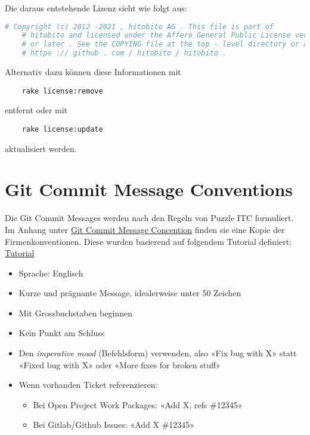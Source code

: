 Die daraus entstehende Lizenz sieht wie folgt aus:

\begin{lstlisting}[language=Ruby]
    # Copyright (c) 2012 -2021 , hitobito AG . This file is part of
    # hitobito and licensed under the Affero General Public License version 3
    # or later . See the COPYING file at the top - level directory or at
    # https :// github . com / hitobito / hitobito .
\end{lstlisting}

\newpage

Alternativ dazu können diese Informationen mit 

\begin{verbatim}
    rake license:remove 
\end{verbatim}

entfernt oder mit 

\begin{verbatim}
    rake license:update 
\end{verbatim} aktualisiert werden.

\section{Git Commit Message Conventions}
Die Git Commit Messages werden nach den Regeln von Puzzle ITC formuliert. Im Anhang
unter \hyperref[sec:gitconv]{Git Commit Message Concention} finden sie eine Kopie der Firmenkonventionen. Diese wurden 
basierend auf folgendem Tutorial definiert: \href{https://cbea.ms/git-commit}{Tutorial}

\begin{itemize}
    \item Sprache: Englisch
    \item Kurze und prägnante Message, idealerweise unter 50 Zeichen
    \item Mit Grossbuchstaben beginnen
    \item Kein Punkt am Schluss
    \item Den \textit{imperative mood} (Befehlsform) verwenden, also «Fix bug with X» statt «Fixed bug with X» oder «More fixes for broken stuff»
    \item Wenn vorhanden Ticket referenzieren:
    \begin{itemize}
        \item Bei Open Project Work Packages: «Add X, refs \#12345»
        \item Bei Gitlab/Github Issues: «Add X \#12345»
    \end{itemize}
\end{itemize}

